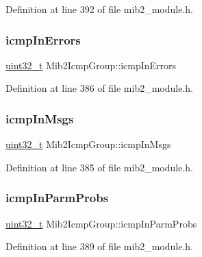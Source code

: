 Definition at line 392 of file mib2\+\_\+module.\+h.

\mbox{\label{structMib2IcmpGroup_a5cd65399321fc0f53917acfa32989e9c}} 
\subsubsection{\texorpdfstring{icmp\+In\+Errors}{icmpInErrors}}
{\footnotesize\ttfamily \hyperlink{stdint_8h_a435d1572bf3f880d55459d9805097f62}{uint32\+\_\+t} Mib2\+Icmp\+Group\+::icmp\+In\+Errors}



Definition at line 386 of file mib2\+\_\+module.\+h.

\mbox{\label{structMib2IcmpGroup_aafe91e356f08aaab2c006ba52346eef3}} 
\subsubsection{\texorpdfstring{icmp\+In\+Msgs}{icmpInMsgs}}
{\footnotesize\ttfamily \hyperlink{stdint_8h_a435d1572bf3f880d55459d9805097f62}{uint32\+\_\+t} Mib2\+Icmp\+Group\+::icmp\+In\+Msgs}



Definition at line 385 of file mib2\+\_\+module.\+h.

\mbox{\label{structMib2IcmpGroup_a7666a01c815a218f1cca3747b9a6f508}} 
\subsubsection{\texorpdfstring{icmp\+In\+Parm\+Probs}{icmpInParmProbs}}
{\footnotesize\ttfamily \hyperlink{stdint_8h_a435d1572bf3f880d55459d9805097f62}{uint32\+\_\+t} Mib2\+Icmp\+Group\+::icmp\+In\+Parm\+Probs}



Definition at line 389 of file mib2\+\_\+module.\+h.

